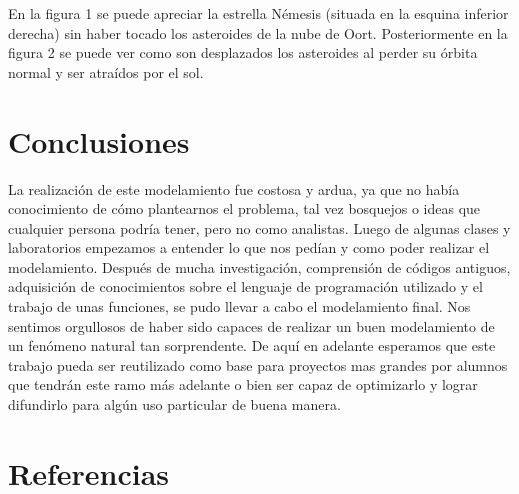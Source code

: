 \documentclass[journal]{IEEEtran}
\begin{document}
En la figura 1 se puede apreciar la estrella Némesis (situada en la esquina inferior derecha) sin haber tocado los asteroides de la nube de Oort. Posteriormente en la figura 2 se puede ver como son desplazados los asteroides al perder su órbita normal y ser atraídos por el sol.

\section{Conclusiones}

La realización de este modelamiento fue costosa y ardua, ya que no había conocimiento de cómo plantearnos el problema, tal vez bosquejos o ideas que cualquier persona podría tener, pero no como analistas. Luego de algunas clases y laboratorios empezamos a entender lo que nos pedían y como poder realizar el modelamiento. Después de mucha investigación, comprensión de códigos antiguos, adquisición de conocimientos sobre el lenguaje de programación utilizado y el trabajo de unas funciones, se pudo llevar a cabo el modelamiento final. Nos sentimos orgullosos de haber sido capaces de realizar un buen modelamiento de un fenómeno natural tan sorprendente. De aquí en adelante esperamos que este trabajo pueda ser reutilizado como base para proyectos mas grandes por alumnos que tendrán este ramo más adelante o bien ser capaz de optimizarlo y lograr difundirlo para algún uso particular de buena manera. \cite{jj2} \cite{astronomia}

\section{Referencias}



\end{document}
